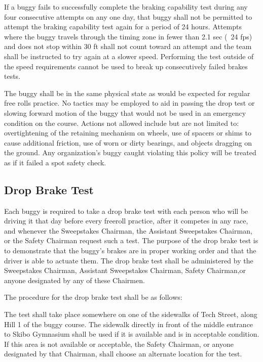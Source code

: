 	If a buggy fails to successfully complete the braking capability test during any four consecutive attempts on any one day, that buggy shall not be permitted to attempt the braking capability test again for a period
	of 24 hours. Attempts where the buggy travels through the timing zone in fewer than 2.1 sec (~24 fps) and does not stop within 30 ft shall not count toward an attempt and the team shall be instructed to try again at a slower speed. Performing the test outside of the speed requirements cannot be used to break up consecutively failed brakes tests. 
	
	The buggy shall be in the same physical state as would be expected for regular free rolls practice. No tactics may be employed to aid in passing the drop test or slowing forward motion of the buggy that would not be used in an emergency condition on the course. Actions not allowed include but are not limited to: overtightening of the retaining mechanism on wheels, use of spacers or shims to cause additional friction, use of worn or dirty bearings, and objects dragging on the ground. Any organization's buggy caught violating this policy will be treated as if it failed a spot safety check.

\subsection{Drop Brake Test}

Each buggy is required to take a drop brake test with each person who will be driving it that day before every freeroll practice, after it competes in any race, and whenever the Sweepstakes Chairman, the Assistant Sweepstakes Chairman, or the Safety Chairman request such a test. The purpose of the drop brake test is to demonstrate that the buggy's brakes are in proper working order and that the driver is able to actuate them. The drop brake test shall be administered by the Sweepstakes Chairman, Assistant Sweepstakes Chairman, Safety Chairman,or anyone designated by any of these Chairmen.

The procedure for the drop brake test shall be as follows:

The test shall take place somewhere on one of the sidewalks of Tech Street, along Hill 1 of the buggy course. The sidewalk directly in front of the middle entrance to Skibo Gymnasium shall be used if it is available and is in acceptable condition. If this area is not available or acceptable, the Safety Chairman, or
anyone designated by that Chairman, shall choose an alternate location for the test.


